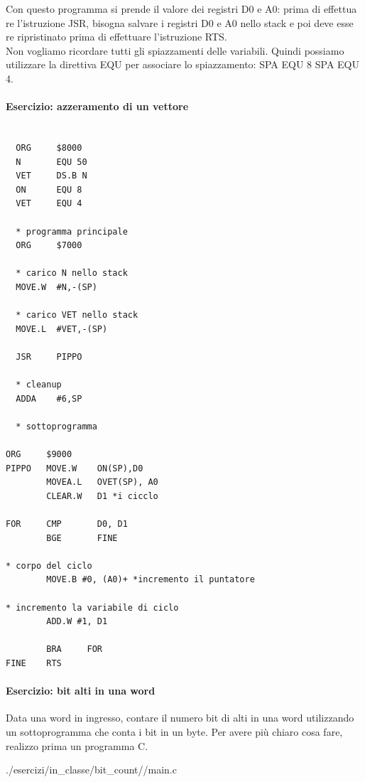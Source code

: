 \documentclass{article}
\begin{document}
Con questo programma si prende il valore dei registri D0 e A0: prima di effettua
re
l'istruzione JSR, bisogna salvare i registri D0 e A0 nello stack e poi deve esse
re
ripristinato prima di effettuare l'istruzione RTS.\\

Non vogliamo ricordare tutti gli spiazzamenti delle variabili. Quindi possiamo
utilizzare la direttiva EQU per associare lo spiazzamento: SPA EQU 8 SPA EQU 4.

\paragraph{Esercizio: azzeramento di un vettore}

\begin{lstlisting}[caption={Esercizio: carico programmi nello stack},
  language={[Motorola68k]Assembler}]

  ORG     $8000
  N       EQU 50
  VET     DS.B N
  ON      EQU 8
  VET     EQU 4

  * programma principale
  ORG     $7000

  * carico N nello stack
  MOVE.W  #N,-(SP)

  * carico VET nello stack
  MOVE.L  #VET,-(SP)

  JSR     PIPPO

  * cleanup
  ADDA    #6,SP

  * sottoprogramma

ORG     $9000
PIPPO   MOVE.W    ON(SP),D0
        MOVEA.L   OVET(SP), A0
        CLEAR.W   D1 *i cicclo

FOR     CMP       D0, D1
        BGE       FINE

* corpo del ciclo
        MOVE.B #0, (A0)+ *incremento il puntatore

* incremento la variabile di ciclo
        ADD.W #1, D1

        BRA     FOR
FINE    RTS  

\end{lstlisting}

\paragraph{Esercizio: bit alti in una word}
Data una word in ingresso, contare il numero bit di alti in una word
utilizzando un sottoprogramma che conta i bit in un byte.
Per avere più chiaro cosa fare, realizzo prima un programma C.


{./esercizi/in_classe/bit_count//main.c}
\end{document}

